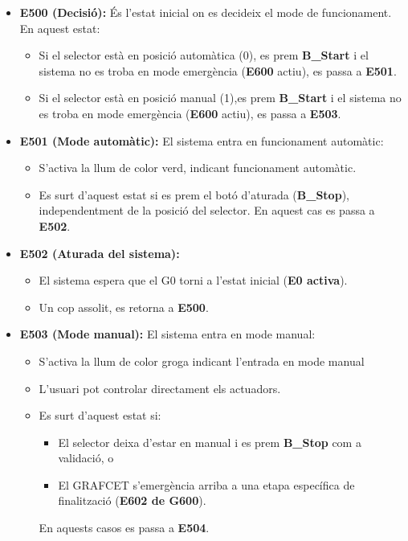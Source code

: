 \documentclass[a4paper,11pt,DIV=13,headings=normal,abstract=true,twoside=semi]{article}
\begin{document}
\begin{itemize}

\item \textbf{E500 (Decisió):}  
És l'estat inicial on es decideix el mode de funcionament.  
En aquest estat:
\begin{itemize}
\item Si el selector està en posició automàtica (0), es prem \textbf{B\_Start} i el sistema no es troba en mode emergència (\textbf{E600} actiu), es passa a \textbf{E501}.
\item Si el selector està en posició manual (1),es prem \textbf{B\_Start} i el sistema no es troba en mode emergència (\textbf{E600} actiu), es passa a \textbf{E503}.
\end{itemize}

\item \textbf{E501 (Mode automàtic):}  
El sistema entra en funcionament automàtic:
\begin{itemize}
\item S'activa la llum de color verd, indicant funcionament automàtic.
\item Es surt d'aquest estat si es prem el botó d'aturada (\textbf{B\_Stop}), independentment de la posició del selector. En aquest cas es passa a \textbf{E502}.
\end{itemize}

\item \textbf{E502 (Aturada del sistema):}  
\begin{itemize}
\item El sistema espera que el G0 torni a l'estat inicial (\textbf{E0 activa}).
\item Un cop assolit, es retorna a \textbf{E500}.
\end{itemize}

\item \textbf{E503 (Mode manual):}  
El sistema entra en mode manual:
\begin{itemize}
\item S'activa la llum de color groga indicant l'entrada en mode manual
\item L'usuari pot controlar directament els actuadors.
\item Es surt d'aquest estat si:
\begin{itemize}
\item El selector deixa d'estar en manual i es prem \textbf{B\_Stop} com a validació, o
\item El GRAFCET s'emergència arriba a una etapa específica de finalització (\textbf{E602 de G600}).
\end{itemize}
En aquests casos es passa a \textbf{E504}.
\end{itemize}


\end{itemize}
\end{document}
